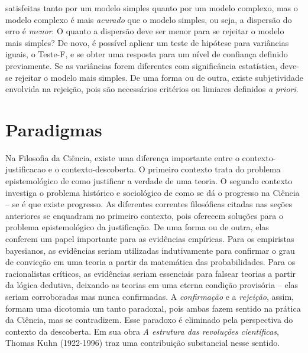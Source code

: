 \documentclass[./main.tex]{subfiles}
\begin{document}
satisfeitas tanto por um modelo simples quanto por um modelo complexo, mas o modelo complexo é mais \textit{acurado} que o modelo simples, ou seja, a dispersão do erro é \textit{menor}. O quanto a dispersão deve ser menor para se rejeitar o modelo mais simples? De novo, é possível aplicar um teste de hipótese para variâncias iguais, o Teste-F, e se obter uma resposta para um nível de confiança definido previamente. Se as variâncias forem diferentes com significância estatística, deve-se rejeitar o modelo mais simples. De uma forma ou de outra, existe subjetividade envolvida na rejeição, pois são necessários critérios ou limiares definidos \textit{a priori}.

\section{Paradigmas} \label{sec:epis:kuhn}

\par Na Filosofia da Ciência, existe uma diferença importante entre o \gls{contexto-justificacao} e o \gls{contexto-descoberta}. O primeiro contexto trata do problema epistemológico de como justificar a verdade de uma teoria. O segundo contexto investiga o problema histórico e sociológico de como se dá o progresso na Ciência – se é que existe progresso. As diferentes correntes filosóficas citadas nas seções anteriores se enquadram no primeiro contexto, pois oferecem soluções para o problema epistemológico da justificação. De uma forma ou de outra, elas conferem um papel importante para as evidências empíricas. Para os empiristas bayesianos, as evidências seriam utilizadas indutivamente para confirmar o grau de convicção em uma teoria a partir da matemática das probabilidades. Para os racionalistas críticos, as evidências seriam essenciais para falsear teorias a partir da lógica dedutiva, deixando as teorias em uma eterna condição provisória – elas seriam corroboradas mas nunca confirmadas. A \textit{confirmação} e a \textit{rejeição}, assim, formam uma dicotomia um tanto paradoxal, pois ambas fazem sentido na prática da Ciência, mas se contradizem. Esse paradoxo é eliminado pela perspectiva do contexto da descoberta. Em sua obra \textit{A estrutura das revoluções científicas}, Thomas Kuhn (1922-1996) traz uma contribuição substancial nesse sentido. 
\end{document}
